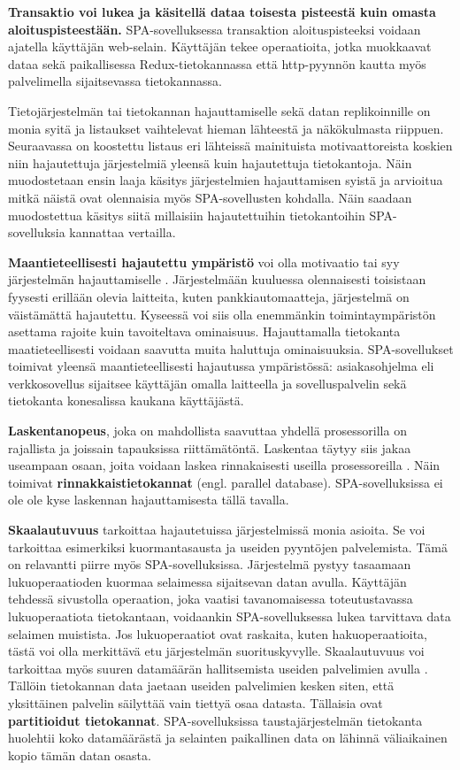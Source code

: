 \documentclass[finnish,twoside,censored,csm,sw-track-2018]{HYthesisML}
\begin{document}
\textbf{Transaktio voi lukea ja käsitellä dataa toisesta pisteestä kuin omasta aloituspisteestään.} SPA-sovelluksessa transaktion aloituspisteeksi voidaan ajatella käyttäjän web-selain. Käyttäjän tekee operaatioita, jotka muokkaavat dataa sekä paikallisessa Redux-tietokannassa että http-pyynnön kautta myös palvelimella sijaitsevassa tietokannassa.

Tietojärjestelmän tai tietokannan hajauttamiselle sekä datan replikoinnille on monia syitä ja listaukset vaihtelevat hieman lähteestä ja näkökulmasta riippuen. Seuraavassa on koostettu listaus eri lähteissä mainituista motivaattoreista koskien niin hajautettuja järjestelmiä yleensä kuin hajautettuja tietokantoja. Näin muodostetaan ensin laaja käsitys järjestelmien hajauttamisen syistä ja arvioitua mitkä näistä ovat olennaisia myös SPA-sovellusten kohdalla. Näin saadaan muodostettua käsitys siitä millaisiin hajautettuihin tietokantoihin SPA-sovelluksia kannattaa vertailla.

\textbf{Maantieteellisesti hajautettu ympäristö} voi olla motivaatio tai syy järjestelmän hajauttamiselle \citep{DSAA}. Järjestelmään kuuluessa olennaisesti toisistaan fyysesti erillään olevia laitteita, kuten pankkiautomaatteja, järjestelmä on väistämättä hajautettu. Kyseessä voi siis olla enemmänkin toimintaympäristön asettama rajoite kuin tavoiteltava ominaisuus. Hajauttamalla tietokanta maatieteellisesti voidaan saavutta muita haluttuja ominaisuuksia. SPA-sovellukset toimivat yleensä maantieteellisesti hajautussa ympäristössä: asiakasohjelma eli verkkosovellus sijaitsee käyttäjän omalla laitteella ja sovelluspalvelin sekä tietokanta konesalissa kaukana käyttäjästä.

\textbf{Laskentanopeus}, joka on mahdollista saavuttaa yhdellä prosessorilla on rajallista ja joissain tapauksissa riittämätöntä. Laskentaa täytyy siis jakaa useampaan osaan, joita voidaan laskea rinnakaisesti useilla prosessoreilla \citep{DSAA}. Näin toimivat \textbf{rinnakkaistietokannat} (engl. parallel database). SPA-sovelluksissa ei ole ole kyse laskennan hajauttamisesta tällä tavalla.

\textbf{Skaalautuvuus} \citep{Tanenbaum} tarkoittaa hajautetuissa järjestelmissä monia asioita. Se voi tarkoittaa esimerkiksi kuormantasausta ja useiden pyyntöjen palvelemista. Tämä on relavantti piirre myös SPA-sovelluksissa. Järjestelmä pystyy tasaamaan lukuoperaatioden kuormaa selaimessa sijaitsevan datan avulla. Käyttäjän tehdessä sivustolla operaation, joka vaatisi tavanomaisessa toteutustavassa lukuoperaatiota tietokantaan, voidaankin SPA-sovelluksessa lukea tarvittava data selaimen muistista. Jos lukuoperaatiot ovat raskaita, kuten hakuoperaatioita, tästä voi olla merkittävä etu järjestelmän suorituskyvylle. Skaalautuvuus voi tarkoittaa myös suuren datamäärän hallitsemista useiden palvelimien avulla \citep{Kleppmann}. Tällöin tietokannan data jaetaan useiden palvelimien kesken siten, että yksittäinen palvelin säilyttää vain tiettyä osaa datasta. Tällaisia ovat \textbf{partitioidut tietokannat}. SPA-sovelluksissa taustajärjestelmän tietokanta huolehtii koko datamäärästä ja selainten paikallinen data on lähinnä väliaikainen kopio tämän datan osasta.
 
\end{document}
